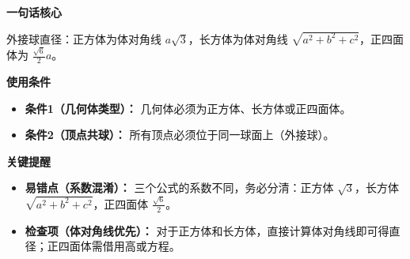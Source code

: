 \begin{summarybox}
	\textbf{\textcolor{CSummary}{一句话核心}}

	外接球直径：正方体为体对角线 $a\sqrt{3}$，长方体为体对角线 $\sqrt{a^2+b^2+c^2}$，正四面体为 $\frac{\sqrt{6}}{2}a$。

	\medskip
	\textbf{\textcolor{CSummary}{使用条件}}
	\begin{itemize}[leftmargin=*, itemsep=0.5em, topsep=0.4em]
		\item \textbf{条件1（几何体类型）：} 几何体必须为正方体、长方体或正四面体。
		\item \textbf{条件2（顶点共球）：} 所有顶点必须位于同一球面上（外接球）。
	\end{itemize}

	\medskip
	\textbf{\textcolor{CSummary}{关键提醒}}
	\begin{itemize}[leftmargin=*, itemsep=0.5em, topsep=0.4em]
		\item \textbf{易错点（系数混淆）：} 三个公式的系数不同，务必分清：正方体 $\sqrt{3}$，长方体 $\sqrt{a^2+b^2+c^2}$，正四面体 $\frac{\sqrt{6}}{2}$。
		\item \textbf{检查项（体对角线优先）：} 对于正方体和长方体，直接计算体对角线即可得直径；正四面体需借用高或方程。
	\end{itemize}
\end{summarybox}
